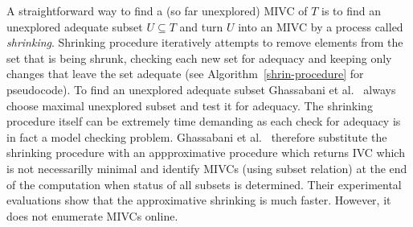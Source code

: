 A straightforward way to find a (so far unexplored) MIVC of $T$ is to find an unexplored adequate subset $U \subseteq T$ and turn $U$  into an MIVC by a process called \emph{shrinking}. Shrinking procedure iteratively attempts to remove elements from the set that is being shrunk, checking each new set for adequacy and keeping only changes that
leave the set adequate (see Algorithm~\ref{shrin-procedure} for pseudocode). To find an unexplored adequate subset Ghassabani et al.~\cite{}  always choose maximal unexplored subset and test it for adequacy.
The shrinking procedure itself can be   extremely time demanding  as  each check for adequacy is in fact a  model checking problem.  Ghassabani et al.~\cite{}  therefore substitute the shrinking procedure  with an appproximative procedure which returns  IVC which is not necessarilly minimal and identify  MIVCs (using subset relation) at the end of the computation when status of all subsets is determined. Their experimental evaluations show that the approximative shrinking is much faster. However,  it does not enumerate MIVCs online.
 

%
%
%


